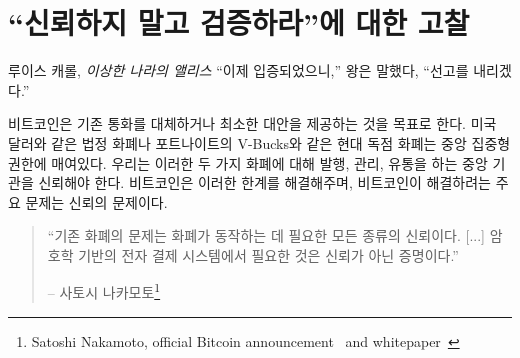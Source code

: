 \chapter{ \enquote{신뢰하지 말고 검증하라}에 대한 고찰}
\label{les:16}

\begin{comment}
	\begin{chapquote}{Lewis Carroll, \textit{Alice in Wonderland}}
		\enquote{Now for the evidence,} said the King, \enquote{and then the sentence.}
	\end{chapquote}
\end{comment}
\begin{chapquote}{루이스 캐롤, \textit{이상한 나라의 앨리스}}
	\enquote{이제 입증되었으니,} 왕은 말했다, \enquote{선고를 내리겠다.}
\end{chapquote}

\begin{comment}
	Bitcoin aims to replace, or at least provide an alternative to,
	conventional currency. Conventional currency is bound to a centralized
	authority, no matter if we are talking about legal tender like the US
	dollar or modern monopoly money like Fortnite's V-Bucks. In both
	examples, you are bound to trust the central authority to issue, manage
	and circulate your money. Bitcoin unties this bound, and the main issue
	Bitcoin solves is the issue of \textit{trust}.
\end{comment}
비트코인은 기존 통화를 대체하거나 최소한 대안을 제공하는 것을 목표로 한다.
미국 달러와 같은 법정 화폐나 포트나이트의 V-Bucks와 같은 현대 독점 화폐는 중앙 집중형 권한에 매여있다.
우리는 이러한 두 가지 화폐에 대해 발행, 관리, 유통을 하는 중앙 기관을 신뢰해야 한다.
비트코인은 이러한 한계를 해결해주며, 비트코인이 해결하려는 주요 문제는 신뢰의 문제이다. 


\begin{quotation}\begin{samepage}
		\enquote{기존 화폐의 문제는 화폐가 동작하는 데 필요한 모든 종류의 신뢰이다. [...] 
			암호학 기반의 전자 결제 시스템에서 필요한 것은 신뢰가 아닌 증명이다.}
		\begin{flushright} -- 사토시 나카모토\footnote{Satoshi Nakamoto, official Bitcoin announcement~\cite{bitcoin-announcement} and whitepaper~\cite{whitepaper}}
\end{flushright}\end{samepage}\end{quotation}

